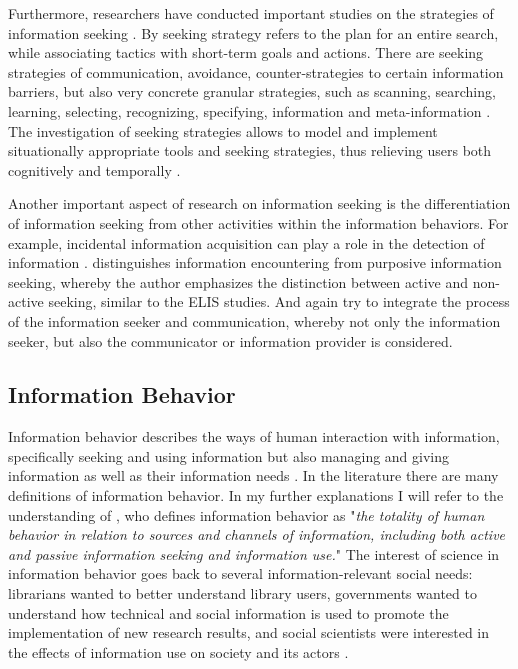 \documentclass[12pt, a4paper, titlepage, oneside, abstract=true, toc=listof, toc=bibliography, BCOR=1cm]{scrreprt}
\begin{document}
Furthermore, researchers have conducted important studies on the strategies of information seeking \citep[e.g.][]{Belkin1993, Belkin1995, Jordan2016, Kriewel2010, McKenzie2002, Mehra2013}. By seeking strategy \citet{Bates1979} refers to the plan for an entire search, while associating tactics with short-term goals and actions. There are seeking strategies of communication, avoidance, counter-strategies to certain information barriers, but also very concrete granular strategies, such as scanning, searching, learning, selecting, recognizing, specifying, information and meta-information \citep{Belkin1993, Belkin1995}. The investigation of seeking strategies allows to model and implement situationally appropriate tools and seeking strategies, thus relieving users both cognitively and temporally \citep{Kriewel2010}.

Another important aspect of research on information seeking is the differentiation of information seeking from other activities within the information behaviors. For example, incidental information acquisition can play a role in the detection of information \citep{Williamson1998}. \citet{Palsdottir2010} distinguishes information encountering from purposive information seeking, whereby the author emphasizes the distinction between active and non-active seeking, similar to the ELIS studies. And again \citet{Robson2013} try to integrate the process of the information seeker and communication, whereby not only the information seeker, but also the communicator or information provider is considered.
	
\subsection{Information Behavior}
\label{sec:IB}
Information behavior describes the ways of human interaction with information, specifically seeking and using information \citep[p. 2381]{Bates2010} but also managing and giving information as well as their information needs \citep[p. 1]{Fisher2009}. In the literature there are many definitions of information behavior. In my further explanations I will refer to the understanding of \citet[p. 49]{Wilson2000}, who defines information behavior as "\textit{the totality of human behavior in relation to sources and channels of information, including both active and passive information seeking and information use.}" The interest of science in information behavior goes back to several information-relevant social needs: librarians wanted to better understand library users, governments wanted to understand how technical and social information is used to promote the implementation of new research results, and social scientists were interested in the effects of information use on society and its actors \citep[p. 2381]{Bates2010}. 
\end{document}

